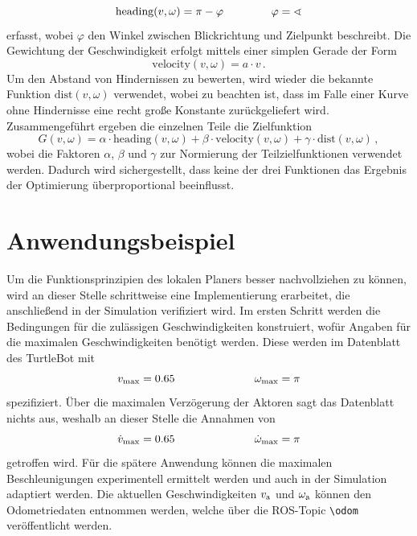 \begin{equation}
\text{heading}(v, \omega) = \pi - \varphi \hspace{1.5cm} \varphi = \sphericalangle 
\end{equation}
erfasst, wobei $\varphi$ den Winkel zwischen Blickrichtung und Zielpunkt beschreibt. Die Gewichtung der Geschwindigkeit erfolgt mittels einer simplen Gerade der Form
\begin{equation}
\text{velocity}(v, \omega) = a\cdot v\,.
\end{equation}
Um den Abstand von Hindernissen zu bewerten, wird wieder die bekannte Funktion $\text{dist}(v,\omega)$ verwendet, wobei zu beachten ist, dass im Falle einer Kurve ohne Hindernisse eine recht große Konstante zurückgeliefert wird. Zusammengeführt ergeben die einzelnen Teile die Zielfunktion
\begin{equation}
G(v, \omega) = \alpha\cdot \text{heading}(v,\omega)+ \beta\cdot \text{velocity}(v,\omega)+\gamma\cdot \text{dist}(v,\omega)\,,
\end{equation}
wobei die Faktoren $\alpha$, $\beta$ und $\gamma$ zur Normierung der Teilzielfunktionen verwendet werden. Dadurch wird sichergestellt, dass keine der drei Funktionen das Ergebnis der Optimierung überproportional beeinflusst.

\section{Anwendungsbeispiel}
Um die Funktionsprinzipien des lokalen Planers besser nachvollziehen zu können, wird an dieser Stelle schrittweise eine Implementierung erarbeitet, die anschließend in der Simulation verifiziert wird. Im ersten Schritt werden die Bedingungen für die zulässigen Geschwindigkeiten konstruiert, wofür Angaben für die maximalen Geschwindigkeiten benötigt werden. Diese werden im Datenblatt des TurtleBot \cite{TurtlebotDS} mit
\begin{equation}
v_{\text{max}} = 0.65 \hspace{2.5cm} \omega_{\text{max}} = \pi
\end{equation}
spezifiziert. Über die maximalen Verzögerung der Aktoren sagt das Datenblatt nichts aus, weshalb an dieser Stelle die Annahmen von 
\begin{equation}
\dot{v}_{\text{max}} = 0.65 \hspace{2.5cm} \dot{\omega}_{\text{max}} =  \pi 
\end{equation}
getroffen wird. Für die spätere Anwendung können die maximalen Beschleunigungen experimentell ermittelt werden und auch in der Simulation adaptiert werden. Die aktuellen Geschwindigkeiten $v_{\text{a}}$ und $\omega_{\text{a}}$ können den Odometriedaten entnommen werden, welche über die ROS-Topic \lstinline{\odom}{} veröffentlicht werden. 


